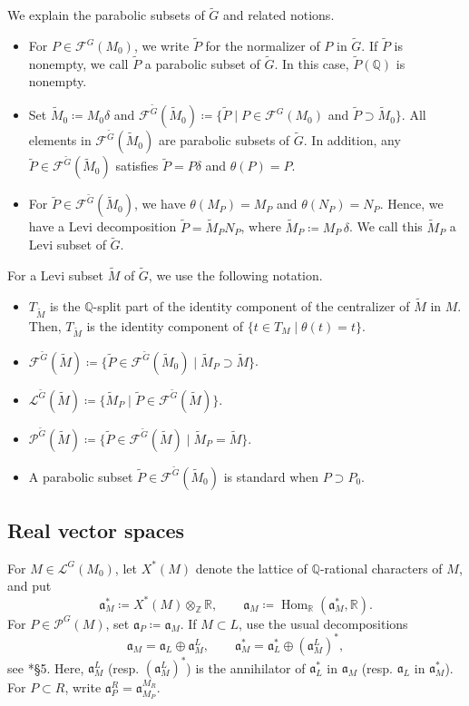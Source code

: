 \documentclass[12pt]{amsart}
\theoremstyle{definition}
\theoremstyle{plain}
\theoremstyle{remark}
\def\R{\mathbb{R}}%
\def\Q{\mathbb{Q}}%
\def\Z{\mathbb{Z}}%
\DeclareMathOperator{\Hom}{Hom}%
\newcommand{\fa}{\mathfrak{a}}
\newcommand{\cF}{\mathcal{F}}
\newcommand{\cL}{\mathcal{L}}
\newcommand{\cP}{\mathcal{P}}
\numberwithin{equation}{section}
\newcommand{\tG}{\widetilde{G}}
\newcommand{\tM}{\widetilde{M}}
\newcommand{\tP}{\widetilde{P}}
\begin{document}
We explain the parabolic subsets of $\tG$ and related notions.
\begin{itemize}
    \item For $P\in\cF^G(M_0)$, we write $\tP$ for the normalizer of $P$ in $\tG$. If $\tP$ is nonempty, we call $\tP$ a parabolic subset of $\tG$. In this case, $\tP(\Q)$ is nonempty.
    \item Set $\tM_0\coloneqq M_0\delta$ and $\cF^{\tG}(\tM_0)\coloneqq\{ \tP \mid P\in\cF^G(M_0)$ and $\tP\supset\tM_0 \}$. 
    All elements in $\cF^{\tG}(\tM_0)$ are parabolic subsets of $\tG$. 
    In addition, any $\tP\in\cF^{\tG}(\tM_0)$ satisfies $\tP=P\delta$ and $\theta(P)=P$. 
    \item For $\tP\in \cF^{\tG}(\tM_0)$, we have $\theta(M_P)=M_P$ and $\theta(N_P)=N_P$. Hence, we have a Levi decomposition $\tP = \tM_P N_P$, where $\tM_P\coloneqq M_P\, \delta$. 
    We call this $\tM_P$ a Levi subset of $\tG$.
\end{itemize}
For a Levi subset $\tM$ of $\tG$, we use the following notation. 
\begin{itemize}
    \item $T_{\tM}$ is the $\Q$-split part of the identity component of the centralizer of $\tM$ in $M$. 
    Then, $T_{\tM}$ is the identity component of $\{ t\in T_M \mid \theta(t)=t \}$.
    \item $\cF^{\tG}(\tM)\coloneqq \{ \tP\in\cF^{\tG}(\tM_0) \mid \tM_P\supset \tM\}$. 
    \item $\cL^{\tG}(\tM)\coloneqq \{ \tM_P \mid \tP\in \cF^{\tG}(\tM)\}$. 
    \item $\cP^{\tG}(\tM) \coloneqq \{ \tP\in \cF^{\tG}(\tM) \mid \tM_P=\tM \}$.
    \item A parabolic subset $\tP\in\cF^{\tG}(\tM_0)$ is standard when $P\supset P_0$.
\end{itemize}





\subsection{Real vector spaces}


For $M\in\cL^G(M_0)$, let $X^*(M)$ denote the lattice of
$\Q$-rational characters of $M$, and put
\[
  \fa_M^*\coloneqq X^*(M)\otimes_{\Z}\R,
  \qquad \fa_M\coloneqq \Hom_{\R}(\fa_M^*,\R).
\]
For $P\in\cP^G(M)$, set $\fa_P\coloneqq \fa_M$.
If $M\subset L$, use the usual decompositions
\[
  \fa_M=\fa_L\oplus\fa_M^L,
  \qquad \fa_M^*=\fa_L^*\oplus(\fa_M^L)^*,
\]
see \cite{Art05}*{\S5}. 
Here, $\fa_M^L$ (resp. $(\fa_M^L)^*$) is the annihilator of $\fa_L^*$ in $\fa_M$ (resp. $\fa_L$ in $\fa_M^*$).
For $P\subset R$, write $\fa_P^R=\fa_{M_P}^{M_R}$.
\end{document}
